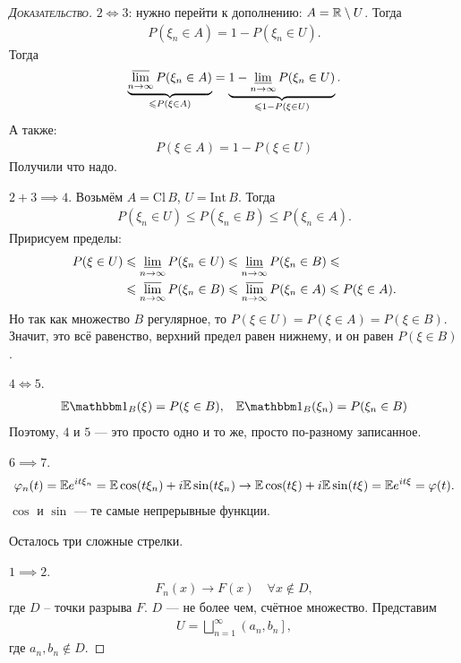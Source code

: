 \documentclass[../main.tex]{subfiles}
\begin{document}
\begin{proof}[\normalfont\textsc{Доказательство}]
 $ 2 \iff 3 $: нужно перейти к дополнению: $ A = \mathbb{R} \setminus U $. Тогда
 \begin{align*}
  P(\xi_n \in A) = 1 - P(\xi_n \in U).
 \end{align*} Тогда
 \begin{align*}
	 \underbrace{\varlimsup_{n \to \infty} P(\xi_n \in A)}_{\leqslant P(\xi \in A)} = \underbrace{1 - \varliminf_{n \to \infty} P(\xi_n \in U)}_{\leqslant 1 - P(\xi \in U)}.
 \end{align*} А также:
 \begin{align*}
  P(\xi \in A) = 1 - P(\xi \in U)
 \end{align*} Получили что надо.

 $ 2 + 3 \implies 4 $. Возьмём $ A = \mathrm{Cl}\,B $, $ U = \mathrm{Int}\,B $. Тогда
 \begin{align*}
  P(\xi_n \in U) \leqslant P(\xi_n \in B) \leqslant P(\xi_n \in A).
 \end{align*} Пририсуем пределы:
 \begin{align*}
  P(\xi \in U) &\leqslant \varliminf_{n \to \infty} P(\xi_n \in U) \leqslant \varliminf_{n \to \infty} P(\xi_n \in B) \leqslant \\
  &\leqslant \varlimsup_{n \to \infty} P(\xi_n \in B) \leqslant \varlimsup_{n \to \infty} P(\xi_n \in A) \leqslant P(\xi \in A).
 \end{align*} Но так как множество $ B $ регулярное, то $ P(\xi \in U) = P(\xi \in A) = P(\xi \in B) $. Значит, это всё равенство, верхний предел равен нижнему, и он равен $ P(\xi \in B) $.

 $ 4 \iff 5 $.
 \begin{align*}
  \E \Ind_B (\xi) = P(\xi \in B), && \E \Ind_B(\xi_n) = P(\xi_n \in B)
 \end{align*} Поэтому, $ 4 $ и $ 5 $ --- это просто одно и то же, просто по-разному записанное.

 $ 6 \implies 7 $.
 \begin{align*}
  \varphi_n(t) = \mathbb E e^{it\xi_n} = \mathbb E \cos(t\xi_n) + i \mathbb E \sin(t\xi_n) \to \mathbb E\cos(t\xi) + i\mathbb E\sin(t\xi) = \mathbb E e^{it\xi} = \varphi(t).
 \end{align*} $ \cos $ и $ \sin $ ---  те самые непрерывные функции.

 Осталось три сложные стрелки.

 $ 1 \implies 2 $.
 \begin{align*}
  F_n(x) \to F(x) \quad \forall x \not\in D,
 \end{align*} где $ D $ -- точки разрыва $ F $. $ D $ --- не более чем, счётное множество. Представим
 \begin{align*}
  U = \bigsqcup_{n=1}^{\infty} \left(a_n, b_n\right],
 \end{align*} где $ a_n, b_n \notin D $.


\end{proof}
\end{document}
